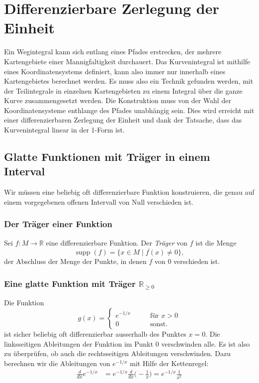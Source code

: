 %
%
\section{Differenzierbare Zerlegung der Einheit}
Ein Wegintegral kann sich entlang eines Pfades erstrecken, der
mehrere Kartengebiete einer Mannigfaltigkeit durchauert.
Das Kurvenintegral ist mithilfe eines Koordinatensystems definiert,
kann also immer nur innerhalb eines Kartengebietes berechnet werden.
Es muss also ein Technik gefunden werden, mit der Teilintegrale in
einzelnen Kartengebieten zu einem Integral über die ganze Kurve
zusammengesetzt werden.
Die Konstruktion muss von der Wahl der Koordinatensysteme enthlange
des Pfades unabhängig sein.
Dies wird erreicht mit einer differenzierbaren Zerlegung der Einheit
und dank der Tatsache, dass das Kurvenintegral linear in der 1-Form
ist.

%
%
\subsection{Glatte Funktionen mit Träger in einem Interval}
Wir müssen eine beliebig oft differenzierbare Funktion konstruieren,
die genau auf einem vorgegebenen offenen Intervall von Null
verschieden ist.

%
%
\subsubsection{Der Träger einer Funktion}

\begin{definition}
Sei $f\colon M\to\mathbb{R}$ eine differenzierbare Funktion.
Der {\em Träger} von $f$ ist die Menge
%
\[
\operatorname{supp}(f)
=
\overline{
\{x\in M\mid f(x)\ne 0\}
},
\]
der Abschluss der Menge der Punkte, in denen $f$ von $0$ verschieden
ist.
\end{definition}

%
%
\subsubsection{Eine glatte Funktion mit Träger $\mathbb{R}_{\ge 0}$}
Die Funktion
\[
g(x)
=
\begin{cases}
e^{-1/x}&\qquad \text{für $x>0$}\\
0       &\qquad \text{sonst.}
\end{cases}
\]
ist sicher beliebig oft differenzierbar ausserhalb des Punktes $x=0$.
Die linksseitigen Ableitungen der Funktion im Punkt $0$ verschwinden
alle.
Es ist also zu überprüfen, ob auch die rechtsseitigen Ableitungen
verschwinden.
Dazu berechnen wir die Ableitungen von $e^{-1/x}$ mit Hilfe der
Kettenregel:
\begin{align*}
\frac{d}{dx}e^{-1/x}
&=
e^{-1/x}\frac{d}{dx}\biggl(-\frac1x\biggr)
=
e^{-1/x}\frac{1}{x^2}
\\
\end{align*}

